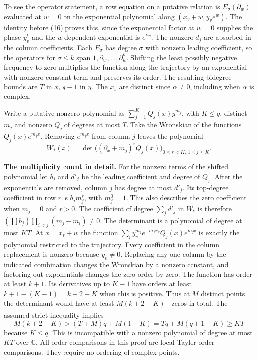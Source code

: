 \documentclass[11pt,a4paper]{article}
\begin{document}
To see the operator statement, a row equation on a putative relation is \(E_\sigma(\partial_w)\) evaluated at \(w=0\) on the exponential polynomial along \((x_v+w,y_ve^w)\). The identity before \hyperref[eq:16]{(16)} proves this, since the exponential factor at \(w=0\) supplies the phase \(y_v^t\) and the \(w\)-dependent exponential is \(e^{tw}\). The nonzero \(d_j\) are absorbed in the column coefficients. Each \(E_\sigma\) has degree \(\sigma\) with nonzero leading coefficient, so the operators for \(\sigma\le k\) span \(1,\partial_w,\ldots,\partial_w^k\). Shifting the least possibly negative frequency to zero multiplies the function along the trajectory by an exponential with nonzero constant term and preserves its order. The resulting bidegree bounds are \(T\) in \(x\), \(q-1\) in \(y\). The \(x_v\) are distinct since \(\alpha\ne0\), including when \(\alpha\) is complex.

Write a putative nonzero polynomial as \(\sum_{j=1}^K Q_j(x)y^{m_j}\), with \(K\le q\), distinct \(m_j\) and nonzero \(Q_j\) of degrees at most \(T\). Take the Wronskian of the functions \(Q_j(x)e^{m_jx}\). Removing \(e^{m_jx}\) from column \(j\) leaves the polynomial \[
 W_*(x)=\det\big((\partial_x+m_j)^r Q_j(x)\big)_{0\le r<K,\ 1\le j\le K}.
\]

\textbf{The multiplicity count in detail.} For the nonzero terms of the shifted polynomial let \(b_j\) and \(d'_j\) be the leading coefficient and degree of \(Q_j\). After the exponentials are removed, column \(j\) has degree at most \(d'_j\). Its top-degree coefficient in row \(r\) is \(b_jm_j^r\), with \(m_j^0=1\). This also describes the zero coefficient when \(m_j=0\) and \(r>0\). The coefficient of degree \(\sum_j d'_j\) in \(W_*\) is therefore \((\prod b_j)\prod_{i<j}(m_j-m_i)\ne0\). The determinant is a polynomial of degree at most \(KT\). At \(x=x_v+w\) the function \(\sum_j y_v^{m_j} e^{-m_jx_v}Q_j(x)e^{m_jx}\) is exactly the polynomial restricted to the trajectory. Every coefficient in the column replacement is nonzero because \(y_v\ne0\). Replacing any one column by the indicated combination changes the Wronskian by a nonzero constant, and factoring out exponentials changes the zero order by zero. The function has order at least \(k+1\). Its derivatives up to \(K-1\) have orders at least \(k+1-(K-1)=k+2-K\) when this is positive. Thus at \(M\) distinct points the determinant would have at least \(M(k+2-K)_+\) zeros in total. The assumed strict inequality implies \[
 M(k+2-K)>(T+M)q+M(1-K)=Tq+M(q+1-K)\ge KT
\] because \(K\le q\). This is incompatible with a nonzero polynomial of degree at most \(KT\) over \(\mathbb C\). All order comparisons in this proof are local Taylor-order comparisons. They require no ordering of complex points.
\end{document}
